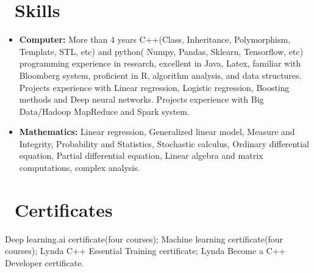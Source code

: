 \documentclass{resume}
\begin{document}
\section{\faWrench
\ Skills}
\begin{itemize}[parsep=0.5ex]\large
  \item \textbf{Computer:} More than 4 years C++(Class,  Inheritance,  Polymorphism,  Template,  STL,  etc) and python( Numpy,  Pandas, 
  Sklearn,  Tensorflow,  etc) programming experience in research,   excellent in Java,  Latex,  familiar with Bloomberg system, proficient in R, algorithm analysis, and data structures. Projects experience with Linear regression, Logistic regression, Boosting methods and Deep neural networks.  Projects experience with Big Data/Hadoop MapReduce and Spark system. 
  
  \item \textbf{Mathematics:}
   Linear regression, Generalized linear model, Measure and Integrity,  Probability and Statistics,  Stochastic calculus, Ordinary differential equation,
  Partial differential equation,  Linear algebra and matrix computations,  complex analysis.
  
\end{itemize}

\section{\faShirtsinbulk \ Certificates}\large 
Deep learning.ai certificate(four courses); Machine learning certificate(four courses); Lynda C++ Essential Training certificate; Lynda Become a C++ Developer certificate.

%
%
\end{document}
